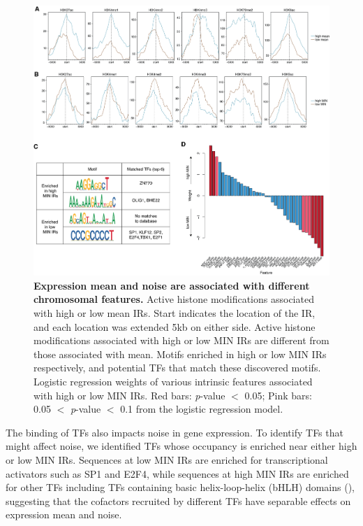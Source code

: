 \begin{figure}[t!]  
    \centering
    \includegraphics[width=\linewidth]{figures/cas/cas_figure3.png}
    \caption[Chromosomal features associated with expression mean and noise.]{%
        \textbf{Expression mean and noise are associated with different chromosomal features.}
        Active histone modifications associated with high or low mean IRs. Start indicates the location of the IR, and each location was extended 5kb on either side.
        Active histone modifications associated with high or low MIN IRs are different from those associated with mean.
        Motifs enriched in high or low MIN IRs respectively, and potential TFs that match these discovered motifs.
        Logistic regression weights of various intrinsic features associated with high or low MIN IRs. Red bars: \textit{p}-value $<$ 0.05; Pink bars: 0.05 $<$ \textit{p}-value $<$ 0.1 from the logistic regression model.  
    }
    \label{fig:cas_figure3}
\end{figure}

The binding of TFs also impacts noise in gene expression. To identify TFs that might affect noise, we identified TFs whose occupancy is enriched near either high or low MIN IRs. Sequences at low MIN IRs are enriched for transcriptional activators such as SP1 and E2F4, while sequences at high MIN IRs are enriched for other TFs including TFs containing basic helix-loop-helix (bHLH) domains (), suggesting that the cofactors recruited by different TFs have separable effects on expression mean and noise. 

